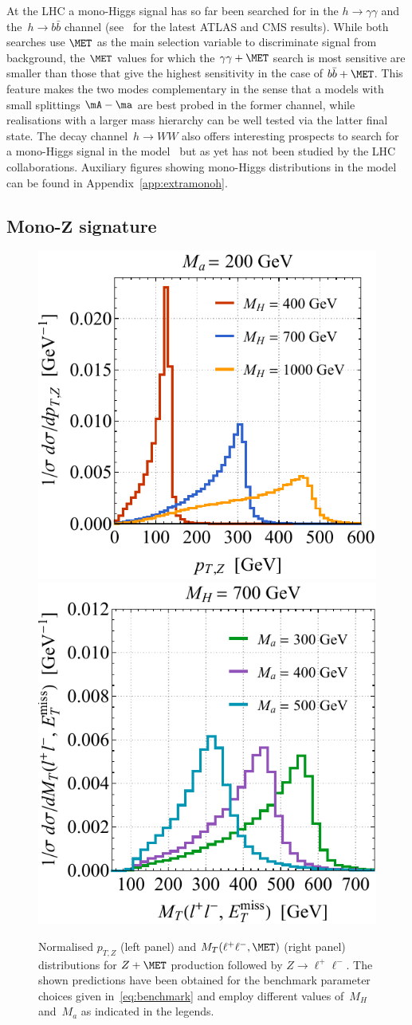 At the LHC a mono-Higgs signal has so far been searched for in the $h \to \gamma \gamma$ and the~$h \to b \bar b$ channel (see~\cite{Aaboud:2017uak,Aaboud:2017yqz,CMS-PAS-B2G-17-004}  for the latest ATLAS and CMS results).  While both searches use $\MET$ as the main selection variable to discriminate signal from background, the $\MET$ values for which the $\gamma \gamma + \MET$ search is most sensitive are smaller than those that give the highest sensitivity in the case of $b \bar b + \MET$. This feature makes the two modes complementary in the sense that a models with  small  splittings $\mA - \ma$ are best probed in the former channel, while realisations with a larger mass hierarchy can be well tested via the latter final state. The decay channel~$h \to WW$ also offers interesting prospects to search for a mono-Higgs signal in the \hdma model~\cite{GPHeidelberg} but as yet has not been studied by the LHC collaborations.  Auxiliary figures showing mono-Higgs distributions in the \hdma model can be found in Appendix~\ref{app:extramonoh}. 

\subsection*{Mono-$\bm{Z}$ signature}

\begin{figure}[t!]
\centering
\includegraphics[height=0.45\textwidth]{texinputs/04_grid/newfigures/ptzspec.pdf}	\qquad 
\includegraphics[height=0.45\textwidth]{texinputs/04_grid/newfigures/mtspec.pdf}
\vspace{2mm}
\caption{\label{fig:zptmt} Normalised $p_{T,Z}$ (left panel) and $M_T (\ell^+ \ell^-, \MET)$ (right panel) distributions for $Z + \MET$ production followed by $Z \to \ell^+ \ell^-$. The shown predictions have been obtained for the \hdma benchmark parameter choices  given in~\eqref{eq:benchmark} and employ different values of~$M_H$ and~$M_a$ as indicated in the legends.}
\end{figure}

